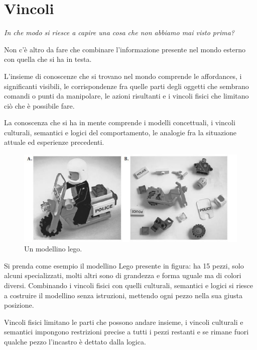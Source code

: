 \chapter{Vincoli}
\begin{flushleft}
	\textit{In che modo si riesce a capire una cosa che non abbiamo mai visto prima?}
\end{flushleft}

Non c'è altro da fare che combinare l'informazione presente nel mondo esterno con quella che si ha in testa.

L'insieme di conoscenze che si trovano nel mondo comprende le affordances, i significanti visibili, le corrispondenze fra quelle parti degli oggetti che sembrano comandi o punti da manipolare, le azioni risultanti e i vincoli fisici che limitano ciò che è possibile fare.

La conoscenza che si ha in mente comprende i modelli concettuali, i vincoli culturali, semantici e logici del comportamento, le analogie fra la situazione attuale ed esperienze precedenti.

\begin{figure}[!h]
	\centering
	\includegraphics[scale = 0.7]{"immagini/Modellino Lego"}
	\caption{Un modellino lego.}
\end{figure}

Si prenda come esempio il modellino Lego presente in figura: ha 15 pezzi, solo alcuni specializzati, molti altri sono di grandezza e forma uguale ma di colori diversi. Combinando i vincoli fisici con quelli culturali, semantici e logici si riesce a costruire il modellino senza istruzioni, mettendo ogni pezzo nella sua giusta posizione.

Vincoli fisici limitano le parti che possono andare insieme, i vincoli culturali e semantici impongono restrizioni precise a tutti i pezzi restanti e se rimane fuori qualche pezzo l'incastro è dettato dalla logica.

